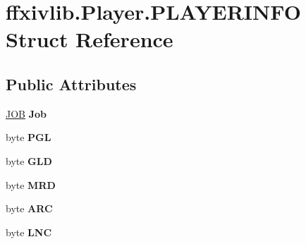 \hypertarget{structffxivlib_1_1_player_1_1_p_l_a_y_e_r_i_n_f_o}{\section{ffxivlib.\-Player.\-P\-L\-A\-Y\-E\-R\-I\-N\-F\-O Struct Reference}
\label{structffxivlib_1_1_player_1_1_p_l_a_y_e_r_i_n_f_o}
}
\subsection*{Public Attributes}
\begin{DoxyCompactItemize}
\item 
\hypertarget{structffxivlib_1_1_player_1_1_p_l_a_y_e_r_i_n_f_o_ac9fa36ba16ba6de0c095e719499e3161}{\hyperlink{namespaceffxivlib_a7273810711af045adb7151580e025a86}{J\-O\-B} {\bfseries Job}}\label{structffxivlib_1_1_player_1_1_p_l_a_y_e_r_i_n_f_o_ac9fa36ba16ba6de0c095e719499e3161}

\item 
\hypertarget{structffxivlib_1_1_player_1_1_p_l_a_y_e_r_i_n_f_o_a02da933d2d2a5fd52f48985c32766362}{byte {\bfseries P\-G\-L}}\label{structffxivlib_1_1_player_1_1_p_l_a_y_e_r_i_n_f_o_a02da933d2d2a5fd52f48985c32766362}

\item 
\hypertarget{structffxivlib_1_1_player_1_1_p_l_a_y_e_r_i_n_f_o_ae92ce14749b8bef22302c93f8b6fcc06}{byte {\bfseries G\-L\-D}}\label{structffxivlib_1_1_player_1_1_p_l_a_y_e_r_i_n_f_o_ae92ce14749b8bef22302c93f8b6fcc06}

\item 
\hypertarget{structffxivlib_1_1_player_1_1_p_l_a_y_e_r_i_n_f_o_a419071b0828fa14f989c7a658f77b581}{byte {\bfseries M\-R\-D}}\label{structffxivlib_1_1_player_1_1_p_l_a_y_e_r_i_n_f_o_a419071b0828fa14f989c7a658f77b581}

\item 
\hypertarget{structffxivlib_1_1_player_1_1_p_l_a_y_e_r_i_n_f_o_a8538e2e919f6735bd62c1e810148855f}{byte {\bfseries A\-R\-C}}\label{structffxivlib_1_1_player_1_1_p_l_a_y_e_r_i_n_f_o_a8538e2e919f6735bd62c1e810148855f}

\item 
\hypertarget{structffxivlib_1_1_player_1_1_p_l_a_y_e_r_i_n_f_o_a160d923c83dd5d1c3b94f0c402d92412}{byte {\bfseries L\-N\-C}}\label{structffxivlib_1_1_player_1_1_p_l_a_y_e_r_i_n_f_o_a160d923c83dd5d1c3b94f0c402d92412}


\end{DoxyCompactItemize}
